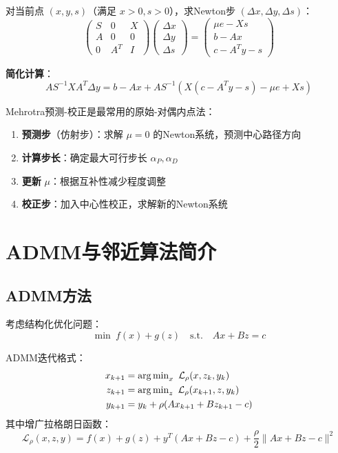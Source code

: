 对当前点 $(x, y, s)$（满足 $x > 0, s > 0$），求Newton步 $(\Delta x, \Delta y, \Delta s)$：
\[
\begin{pmatrix}
S & 0 & X \\
A & 0 & 0 \\
0 & A^T & I
\end{pmatrix}
\begin{pmatrix} \Delta x \\ \Delta y \\ \Delta s \end{pmatrix} =
\begin{pmatrix} \mu e - Xs \\ b - Ax \\ c - A^T y - s \end{pmatrix}
\]

\textbf{简化计算}：
\[
A S^{-1} X A^T \Delta y = b - Ax + A S^{-1}(X(c-A^T y-s) - \mu e + Xs)
\]

\begin{notebox}
Mehrotra预测-校正是最常用的原始-对偶内点法：
\begin{enumerate}[label=\arabic*.]
    \item \textbf{预测步}（仿射步）：求解 $\mu = 0$ 的Newton系统，预测中心路径方向
    \item \textbf{计算步长}：确定最大可行步长 $\alpha_P, \alpha_D$
    \item \textbf{更新} $\mu$：根据互补性减少程度调整
    \item \textbf{校正步}：加入中心性校正，求解新的Newton系统
\end{enumerate}
\end{notebox}

\section{ADMM与邻近算法简介}\label{sec:admm-proximal}

\subsection{ADMM方法}

\begin{definition}
考虑结构化优化问题：
\[
\min\ f(x) + g(z)\quad \text{s.t.}\quad Ax + Bz = c
\]

ADMM迭代格式：
\begin{align*}
x_{k+1} &= \operatorname{arg\,min}_x\ \mathcal{L}_\rho(x, z_k, y_k) \\
z_{k+1} &= \operatorname{arg\,min}_z\ \mathcal{L}_\rho(x_{k+1}, z, y_k) \\
y_{k+1} &= y_k + \rho(Ax_{k+1} + Bz_{k+1} - c)
\end{align*}
其中增广拉格朗日函数：
\[
\mathcal{L}_\rho(x, z, y) = f(x) + g(z) + y^T(Ax + Bz - c) + \frac{\rho}{2}\|Ax + Bz - c\|^2
\]
\end{definition}

